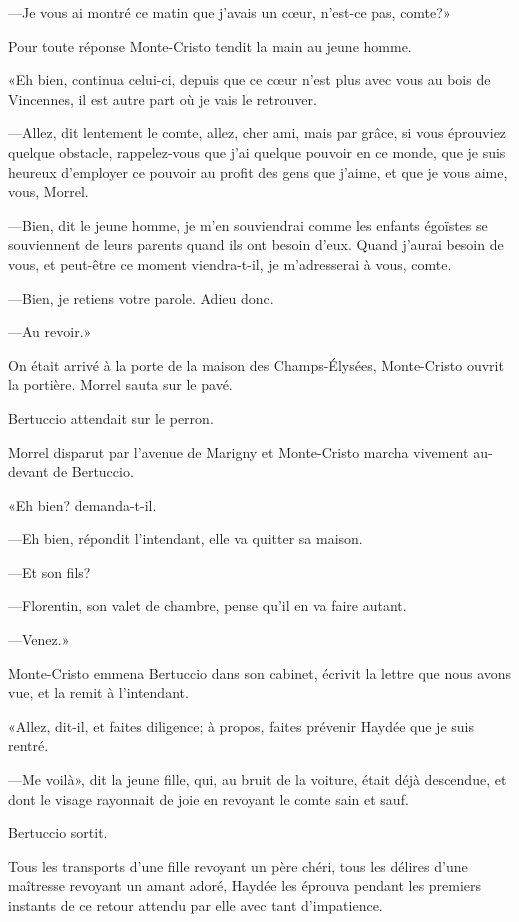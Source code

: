 —Je vous ai montré ce matin que j'avais un cœur, n'est-ce pas, comte?» 

Pour toute réponse Monte-Cristo tendit la main au jeune homme. 

«Eh bien, continua celui-ci, depuis que ce cœur n'est plus avec vous au bois de Vincennes, il est autre part où je vais le retrouver. 

—Allez, dit lentement le comte, allez, cher ami, mais par grâce, si vous éprouviez quelque obstacle, rappelez-vous que j'ai quelque pouvoir en ce monde, que je suis heureux d'employer ce pouvoir au profit des gens que j'aime, et que je vous aime, vous, Morrel. 

—Bien, dit le jeune homme, je m'en souviendrai comme les enfants égoïstes se souviennent de leurs parents quand ils ont besoin d'eux. Quand j'aurai besoin de vous, et peut-être ce moment viendra-t-il, je m'adresserai à vous, comte. 

—Bien, je retiens votre parole. Adieu donc. 

—Au revoir.» 

On était arrivé à la porte de la maison des Champs-Élysées, Monte-Cristo ouvrit la portière. Morrel sauta sur le pavé. 

Bertuccio attendait sur le perron. 

Morrel disparut par l'avenue de Marigny et Monte-Cristo marcha vivement au-devant de Bertuccio. 

«Eh bien? demanda-t-il. 

—Eh bien, répondit l'intendant, elle va quitter sa maison. 

—Et son fils? 

—Florentin, son valet de chambre, pense qu'il en va faire autant. 

—Venez.» 

Monte-Cristo emmena Bertuccio dans son cabinet, écrivit la lettre que nous avons vue, et la remit à l'intendant. 

«Allez, dit-il, et faites diligence; à propos, faites prévenir Haydée que je suis rentré. 

—Me voilà», dit la jeune fille, qui, au bruit de la voiture, était déjà descendue, et dont le visage rayonnait de joie en revoyant le comte sain et sauf. 

Bertuccio sortit. 

Tous les transports d'une fille revoyant un père chéri, tous les délires d'une maîtresse revoyant un amant adoré, Haydée les éprouva pendant les premiers instants de ce retour attendu par elle avec tant d'impatience. 

